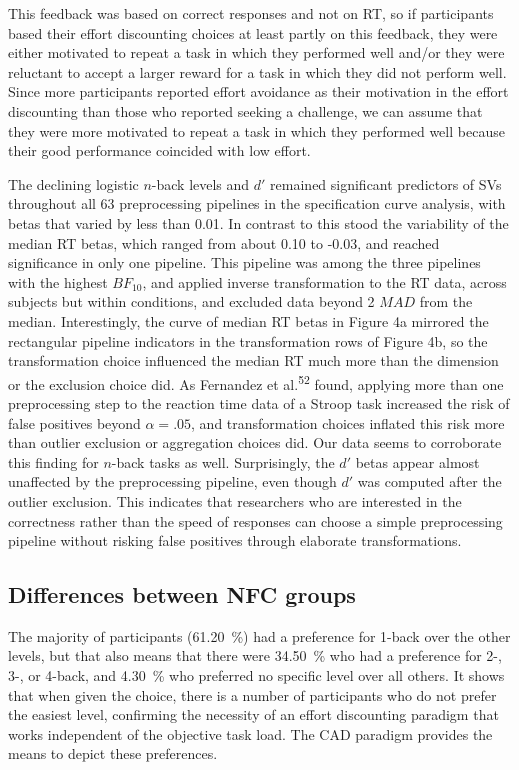 \documentclass[
  man,floatsintext]{apa6}
\begin{document}
This feedback was based on correct responses and not on RT, so if participants based their effort discounting choices at least partly on this feedback, they were either motivated to repeat a task in which they performed well and/or they were reluctant to accept a larger reward for a task in which they did not perform well.
Since more participants reported effort avoidance as their motivation in the effort discounting than those who reported seeking a challenge, we can assume that they were more motivated to repeat a task in which they performed well because their good performance coincided with low effort.

The declining logistic \(n\)-back levels and \(d'\) remained significant predictors of SVs throughout all 63 preprocessing pipelines in the specification curve analysis, with betas that varied by less than 0.01.
In contrast to this stood the variability of the median RT betas, which ranged from about 0.10 to -0.03, and reached significance in only one pipeline.
This pipeline was among the three pipelines with the highest \(BF_{10}\), and applied inverse transformation to the RT data, across subjects but within conditions, and excluded data beyond 2 \(MAD\) from the median.
Interestingly, the curve of median RT betas in Figure 4a mirrored the rectangular pipeline indicators in the transformation rows of Figure 4b, so the transformation choice influenced the median RT much more than the dimension or the exclusion choice did.
As Fernandez et al.\textsuperscript{52} found, applying more than one preprocessing step to the reaction time data of a Stroop task increased the risk of false positives beyond \(\alpha=.05\), and transformation choices inflated this risk more than outlier exclusion or aggregation choices did.
Our data seems to corroborate this finding for \(n\)-back tasks as well.
Surprisingly, the \(d'\) betas appear almost unaffected by the preprocessing pipeline, even though \(d'\) was computed after the outlier exclusion.
This indicates that researchers who are interested in the correctness rather than the speed of responses can choose a simple preprocessing pipeline without risking false positives through elaborate transformations.

\hypertarget{differences-between-nfc-groups-1}{%
\subsection{Differences between NFC groups}\label{differences-between-nfc-groups-1}}

The majority of participants (61.20~\%) had a preference for 1-back over the other levels, but that also means that there were 34.50~\% who had a preference for 2-, 3-, or 4-back, and 4.30~\% who preferred no specific level over all others.
It shows that when given the choice, there is a number of participants who do not prefer the easiest level, confirming the necessity of an effort discounting paradigm that works independent of the objective task load.
The CAD paradigm provides the means to depict these preferences.
\end{document}
